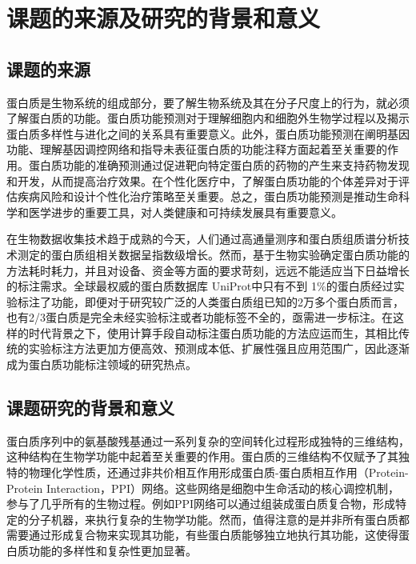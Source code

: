 
\chapter{课题的来源及研究的背景和意义}


\section{课题的来源}
蛋白质是生物系统的组成部分，要了解生物系统及其在分子尺度上的行为，就必须了解蛋白质的功能。蛋白质功能预测对于理解细胞内和细胞外生物学过程以及揭示蛋白质多样性与进化之间的关系具有重要意义。此外，蛋白质功能预测在阐明基因功能、理解基因调控网络和指导未表征蛋白质的功能注释方面起着至关重要的作用\cite{eisenberg2000protein}。蛋白质功能的准确预测通过促进靶向特定蛋白质的药物的产生来支持药物发现和开发，从而提高治疗效果。在个性化医疗中，了解蛋白质功能的个体差异对于评估疾病风险和设计个性化治疗策略至关重要。总之，蛋白质功能预测是推动生命科学和医学进步的重要工具，对人类健康和可持续发展具有重要意义。

在生物数据收集技术趋于成熟的今天，人们通过高通量测序和蛋白质组质谱分析技术测定的蛋白质组相关数据呈指数级增长。然而，基于生物实验确定蛋白质功能的方法耗时耗力，并且对设备、资金等方面的要求苛刻，远远不能适应当下日益增长的标注需求。全球最权威的蛋白质数据库 UniProt\cite{uniprot2021uniprot}中只有不到 1$\%$的蛋白质经过实验标注了功能，即便对于研究较广泛的人类蛋白质组已知的2万多个蛋白质而言，也有2/3蛋白质是完全未经实验标注或者功能标签不全的\cite{boutet2016uniprotkb}，亟需进一步标注。在这样的时代背景之下，使用计算手段自动标注蛋白质功能的方法应运而生，其相比传统的实验标注方法更加方便高效、预测成本低、扩展性强且应用范围广，因此逐渐成为蛋白质功能标注领域的研究热点。

\section{课题研究的背景和意义}
蛋白质序列中的氨基酸残基通过一系列复杂的空间转化过程形成独特的三维结构，这种结构在生物学功能中起着至关重要的作用。蛋白质的三维结构不仅赋予了其独特的物理化学性质，还通过非共价相互作用形成蛋白质-蛋白质相互作用（Protein-Protein Interaction，PPI）网络。这些网络是细胞中生命活动的核心调控机制，参与了几乎所有的生物过程。例如PPI网络可以通过组装成蛋白质复合物，形成特定的分子机器，来执行复杂的生物学功能。然而，值得注意的是并非所有蛋白质都需要通过形成复合物来实现其功能，有些蛋白质能够独立地执行其功能，这使得蛋白质功能的多样性和复杂性更加显著。


